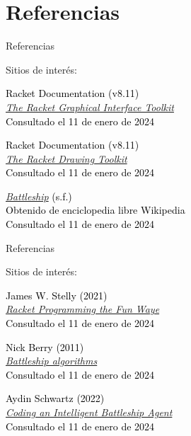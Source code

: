 
\section{Referencias}


\begin{frame}{Referencias}
\begin{block}{Sitios de interés:}
\begin{thebibliography}{10}

\textcolor{black}{Racket Documentation (v8.11)}\\
\emph{\href{https://docs.racket-lang.org/gui/index.html}{The Racket Graphical Interface Toolkit}}\\
\textcolor{black}{Consultado el 11 de enero de 2024}

\textcolor{black}{Racket Documentation (v8.11)}\\
\emph{\href{https://docs.racket-lang.org/draw/index.html}{The Racket Drawing Toolkit}}\\
\textcolor{black}{Consultado el 11 de enero de 2024}

\emph{\href{https://en.wikipedia.org/wiki/Battleship_(game)}{Battleship}} \textcolor{black}{(s.f.)}\\
\textcolor{black}{Obtenido de enciclopedia libre Wikipedia}\\
\textcolor{black}{Consultado el 11 de enero de 2024}

\end{thebibliography}
\end{block}
\end{frame}



\begin{frame}{Referencias}
\begin{block}{Sitios de interés:}
\begin{thebibliography}{10}

\textcolor{black}{James W. Stelly (2021)}\\
\emph{\href{https://www.google.es/books/edition/Racket_Programming_the_Fun_Way/u54LEAAAQBAJ?hl=es&gbpv=0}{Racket Programming the Fun Waye}}\\
\textcolor{black}{Consultado el 11 de enero de 2024}

\textcolor{black}{Nick Berry (2011)}\\
\emph{\href{http://www.datagenetics.com/blog/december32011/}{Battleship algorithms}}\\
\textcolor{black}{Consultado el 11 de enero de 2024}

\textcolor{black}{Aydin Schwartz (2022)}\\
\emph{\href{https://towardsdatascience.com/coding-an-intelligent-battleship-agent-bf0064a4b319}{Coding an Intelligent Battleship Agent}}\\
\textcolor{black}{Consultado el 11 de enero de 2024}

\end{thebibliography}
\end{block}
\end{frame}

